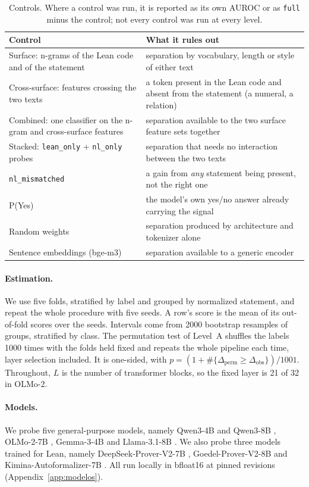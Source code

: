 \documentclass[10pt]{article}
\newcommand{\vr}[1]{\texttt{#1}}
\newcommand{\D}{\Delta}
\begin{document}
\begin{table}[h]
\centering
\caption{Controls. Where a control was run, it is reported as its own AUROC or as \vr{full} minus the control; not every control was run at every level.}
\label{tab:controles}
\vspace{2pt}
\begin{tabularx}{\linewidth}{@{}lX@{}}
\toprule
Control & What it rules out\\
\midrule
Surface: n-grams of the Lean code and of the statement & separation by vocabulary, length or style of either text\\
Cross-surface: features crossing the two texts & a token present in the Lean code and absent from the statement (a numeral, a relation)\\
Combined: one classifier on the n-gram and cross-surface features & separation available to the two surface feature sets together\\
Stacked: \vr{lean\_only} + \vr{nl\_only} probes & separation that needs no interaction between the two texts\\
\vr{nl\_mismatched} & a gain from \emph{any} statement being present, not the right one\\
P(Yes) & the model's own yes/no answer already carrying the signal\\
Random weights & separation produced by architecture and tokenizer alone\\
Sentence embeddings (bge-m3) & separation available to a generic encoder\\
\bottomrule
\end{tabularx}
\end{table}

\paragraph{Estimation.}
We use five folds, stratified by label and grouped by normalized statement, and repeat the whole procedure with
five seeds. A row's score is the mean of its out-of-fold scores over the seeds. Intervals come from 2000 bootstrap
resamples of groups, stratified by class. The permutation test of Level~A shuffles the labels 1000 times with the
folds held fixed and repeats the whole pipeline each time, layer selection included. It is one-sided, with
$p = (1 + \#\{\D_{\mathrm{perm}} \ge \D_{\mathrm{obs}}\})/1001$. Throughout, $L$ is the number of transformer
blocks, so the fixed layer is 21 of 32 in OLMo-2.

\paragraph{Models.}
We probe five general-purpose models, namely Qwen3-4B and Qwen3-8B \citep{qwen3}, OLMo-2-7B \citep{olmo2},
Gemma-3-4B \citep{gemma3} and Llama-3.1-8B \citep{llama3}. We also probe three models trained for Lean, namely
DeepSeek-Prover-V2-7B \citep{deepseekproverv2}, Goedel-Prover-V2-8B \citep{goedelproverv2} and
Kimina-Autoformalizer-7B \citep{kimina,kiminaautoformalizer}. All run locally in bfloat16 at pinned
revisions (Appendix~\ref{app:modelos}).
\end{document}
